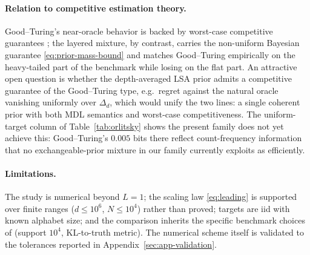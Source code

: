 \documentclass[11pt]{article}
\newcommand{\Nseq}{N}
\begin{document}
\paragraph{Relation to competitive estimation theory.}
Good--Turing's near-oracle behavior is backed by worst-case competitive
guarantees \cite{orlitsky2015competitive,acharya2013tight}; the layered
mixture, by contrast, carries the non-uniform Bayesian guarantee
\eqref{eq:prior-mass-bound} and matches Good--Turing empirically on the
heavy-tailed part of the benchmark while losing on the flat part.  An
attractive open question is whether the depth-averaged LSA prior admits a competitive guarantee of the
Good--Turing type, e.g.\ regret against the natural oracle vanishing
uniformly over \(\Delta_d\), which would unify the two lines: a single
coherent prior with both MDL semantics and worst-case competitiveness.  The
uniform-target column of Table~\ref{tab:orlitsky} shows the present family
does not yet achieve this: Good--Turing's \(0.005\) bits there reflect
count-frequency information that no exchangeable-prior mixture in our family
currently exploits as efficiently.
\paragraph{Limitations.}
The study is numerical beyond \(L=1\); the scaling law
\eqref{eq:leading} is supported over finite ranges
(\(d\le10^6\), \(\Nseq\le10^4\)) rather than proved; targets are iid
with known alphabet size; and the comparison inherits the specific benchmark
choices of \cite{orlitsky2015competitive} (support \(10^4\), KL-to-truth
metric).  The numerical scheme itself is validated to the tolerances
reported in Appendix~\ref{sec:app-validation}.
\end{document}
